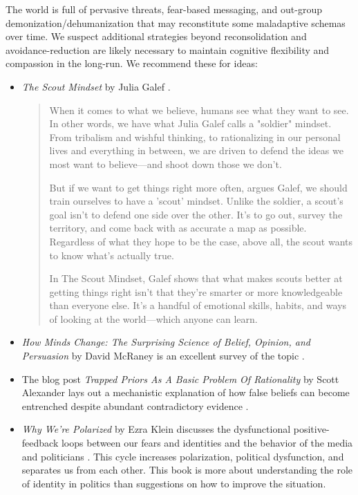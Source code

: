 \documentclass[12pt,letterpaper]{book}
\begin{document}
The world is full of pervasive threats, fear-based messaging, and out-group demonization/dehumanization that may reconstitute some maladaptive schemas over time. We suspect additional strategies beyond reconsolidation and avoidance-reduction are likely necessary to maintain cognitive flexibility and compassion in the long-run. We recommend these for ideas:
\begin{itemize}
    \item \textit{The Scout Mindset} by Julia Galef \cite{galefScoutMindset}.
    \begin{quotation}
        When it comes to what we believe, humans see what they want to see. In other words, we have what Julia Galef calls a "soldier" mindset. From tribalism and wishful thinking, to rationalizing in our personal lives and everything in between, we are driven to defend the ideas we most want to believe—and shoot down those we don't.

        But if we want to get things right more often, argues Galef, we should train ourselves to have a 'scout' mindset. Unlike the soldier, a scout's goal isn't to defend one side over the other. It's to go out, survey the territory, and come back with as accurate a map as possible. Regardless of what they hope to be the case, above all, the scout wants to know what's actually true.
        
        In The Scout Mindset, Galef shows that what makes scouts better at getting things right isn't that they're smarter or more knowledgeable than everyone else. It's a handful of emotional skills, habits, and ways of looking at the world—which anyone can learn.
    \end{quotation}
    \item \textit{How Minds Change: The Surprising Science of Belief, Opinion, and Persuasion} by David McRaney is an excellent survey of the topic \cite{mcraneyMinds}.
    \item The blog post \textit{Trapped Priors As A Basic Problem Of Rationality} by Scott Alexander lays out a mechanistic explanation of how false beliefs can become entrenched despite abundant contradictory evidence \cite{alexanderTrapped}.
    \item \textit{Why We're Polarized} by Ezra Klein discusses the dysfunctional positive-feedback loops between our fears and identities and the behavior of the media and politicians \cite{klein2020Polarized}. This cycle increases polarization, political dysfunction, and separates us from each other. This book is more about understanding the role of identity in politics than suggestions on how to improve the situation.
\end{itemize}
\end{document}
